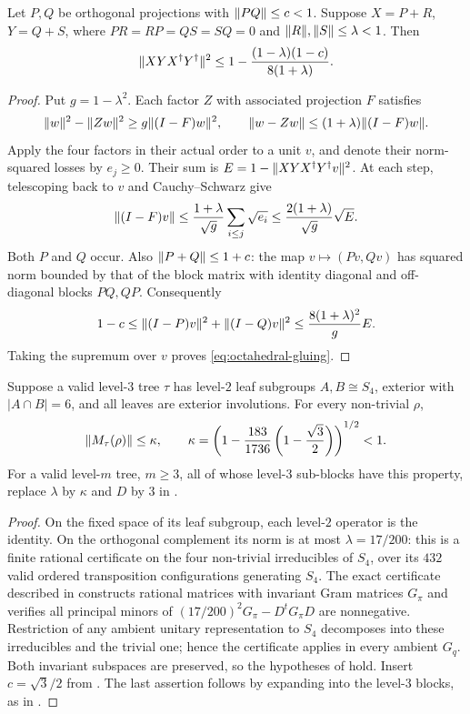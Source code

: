 \begin{lemma}
\label{lem:octahedral-gluing}
Let $P,Q$ be orthogonal projections with $\lVert PQ \rVert\le c<1$. Suppose
$X=P+R$, $Y=Q+S$, where
$PR=RP=QS=SQ=0$ and $\lVert R \rVert,\lVert S \rVert\le\lambda<1$. Then
\begin{equation}\label{eq:octahedral-gluing}
 \lVert XYX^\dagger Y^\dagger \rVert^2
 \le1-\frac{(1-\lambda)(1-c)}{8(1+\lambda)}.
\end{equation}
\end{lemma}
\begin{proof}
Put $g=1-\lambda^2$. Each factor $Z$ with associated projection $F$
satisfies
\[
 \lVert w \rVert^2-\lVert Zw \rVert^2\ge g\lVert (I-F)w \rVert^2,
 \qquad \lVert w-Zw \rVert\le(1+\lambda)\lVert (I-F)w \rVert.
\]
Apply the four factors in their actual order to a unit $v$, and denote
their norm-squared losses by $e_j\ge0$. Their sum is
$E=1-\lVert XYX^\dagger Y^\dagger v \rVert^2$.
At each step, telescoping back to $v$ and Cauchy--Schwarz give
\[
 \lVert (I-F)v \rVert\le\frac{1+\lambda}{\sqrt g}
             \sum_{i\le j}\sqrt{e_i}
       \le\frac{2(1+\lambda)}{\sqrt g}\sqrt E.
\]
Both $P$ and $Q$ occur. Also $\lVert P+Q \rVert\le1+c$: the map
$v\mapsto(Pv,Qv)$ has squared norm bounded by that of the block matrix
with identity diagonal and off-diagonal blocks $PQ,QP$.
Consequently
\[
 1-c\le\lVert (I-P)v \rVert^2+\lVert (I-Q)v \rVert^2
       \le\frac{8(1+\lambda)^2}{g}E.
\]
Taking the supremum over $v$ proves \eqref{eq:octahedral-gluing}.
\end{proof}

\begin{corollary}
\label{cor:octahedral-block}
Suppose a valid level-$3$ tree $\tau$ has level-$2$ leaf subgroups
$A,B\cong S_4$, exterior with $|A\cap B|=6$, and all leaves are exterior
involutions. For every non-trivial $\rho$,
\[
 \lVert M_\tau(\rho) \rVert\le\kappa,
 \qquad
 \kappa=\left(1-\frac{183}{1736}
                       \left(1-\frac{\sqrt3}{2}\right)\right)^{1/2}<1.
\]
For a valid level-$m$ tree, $m\ge3$, all of whose level-$3$ sub-blocks
have this property, replace $\lambda$ by $\kappa$ and $D$ by $3$ in
.
\end{corollary}
\begin{proof}
On the fixed space of its leaf subgroup, each level-$2$ operator is the
identity. On the orthogonal complement its norm is at most
$\lambda=17/200$: this is a finite rational certificate on the four
non-trivial irreducibles of $S_4$, over its $432$ valid ordered
transposition configurations generating $S_4$. The exact certificate
described in  constructs rational matrices with
invariant Gram matrices $G_\pi$ and verifies all principal minors of
$(17/200)^2G_\pi-D^tG_\pi D$ are nonnegative. Restriction of any ambient
unitary representation to $S_4$ decomposes into these irreducibles and
the trivial one; hence the certificate applies in every ambient $G_q$.
Both invariant subspaces are preserved, so the hypotheses of
 hold. Insert $c=\sqrt3/2$ from
. The last assertion follows by expanding
into the level-$3$ blocks, as in .
\end{proof}

